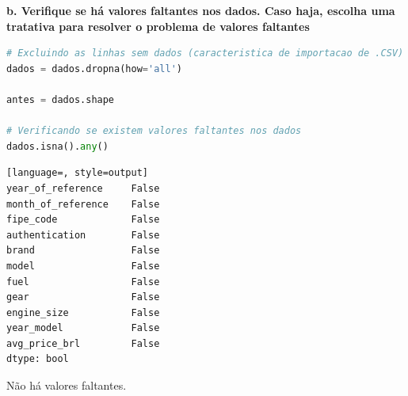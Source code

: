 \begin{table}[H]
\centering
{}
\end{table}

\begin{adjustwidth}{1em}{}
\textbf{b. Verifique se há valores faltantes nos dados. Caso haja, escolha uma tratativa para resolver o problema de valores faltantes}
\end{adjustwidth}

\begin{lstlisting}[language=Python, style=input]
# Excluindo as linhas sem dados (caracteristica de importacao de .CSV)
dados = dados.dropna(how='all')

antes = dados.shape

# Verificando se existem valores faltantes nos dados 
dados.isna().any()
\end{lstlisting}
\begin{lstlisting}[language=, style=output]
year_of_reference     False
month_of_reference    False
fipe_code             False
authentication        False
brand                 False
model                 False
fuel                  False
gear                  False
engine_size           False
year_model            False
avg_price_brl         False
dtype: bool
\end{lstlisting}
Não há valores faltantes.


